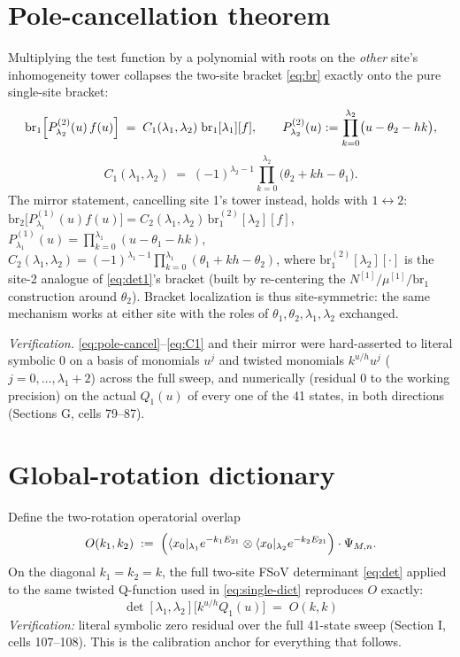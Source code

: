 \documentclass[11pt]{article}
\begin{document}
\section{Pole-cancellation theorem}
\label{sec:pole-cancel}

Multiplying the test function by a polynomial with roots on the \emph{other} site's inhomogeneity
tower collapses the two-site bracket \eqref{eq:br} exactly onto the pure single-site bracket:
\begin{equation}
  \mathrm{br}_1\Bigl[P^{(2)}_{\lambda_2}(u)\,f(u)\Bigr] \;=\; C_1(\lambda_1,\lambda_2)\;\mathrm{br}_1[\lambda_1][f],
  \qquad
  P^{(2)}_{\lambda_2}(u) := \prod_{k=0}^{\lambda_2}\bigl(u-\theta_2-hk\bigr),
  \label{eq:pole-cancel}
\end{equation}
\begin{equation}
  C_1(\lambda_1,\lambda_2) \;=\; (-1)^{\lambda_2-1}\prod_{k=0}^{\lambda_2}\bigl(\theta_2+kh-\theta_1\bigr).
  \label{eq:C1}
\end{equation}
The mirror statement, cancelling site 1's tower instead, holds with $1\leftrightarrow2$:
$\mathrm{br}_2\bigl[P^{(1)}_{\lambda_1}(u) f(u)\bigr] = C_2(\lambda_1,\lambda_2)\,\mathrm{br}_1^{(2)}[\lambda_2][f]$,
$P^{(1)}_{\lambda_1}(u)=\prod_{k=0}^{\lambda_1}(u-\theta_1-hk)$,
$C_2(\lambda_1,\lambda_2)=(-1)^{\lambda_1-1}\prod_{k=0}^{\lambda_1}(\theta_1+kh-\theta_2)$, where
$\mathrm{br}_1^{(2)}[\lambda_2][\cdot]$ is the site-2 analogue of \eqref{eq:det1}'s bracket (built by
re-centering the $N^{[1]}/\mu^{[1]}/\mathrm{br}_1$ construction around $\theta_2$). Bracket
localization is thus site-symmetric: the same mechanism works at either site with the roles of
$\theta_1,\theta_2,\lambda_1,\lambda_2$ exchanged.

\emph{Verification.} \eqref{eq:pole-cancel}--\eqref{eq:C1} and their mirror were hard-asserted to
literal symbolic $0$ on a basis of monomials $u^j$ and twisted monomials $k^{u/h}u^j$
($j=0,\dots,\lambda_1+2$) across the full sweep, and numerically (residual $0$ to the working
precision) on the actual $Q_1(u)$ of every one of the 41 states, in both directions (Sections G,
cells 79--87).

\section{Global-rotation dictionary}
\label{sec:global}

Define the two-rotation operatorial overlap
\begin{equation}
  O(k_1,k_2) \;:=\; \Bigl(\langle x_0|_{\lambda_1}e^{-k_1E_{21}}\otimes\langle x_0|_{\lambda_2}e^{-k_2E_{21}}\Bigr)\cdot\Psi_{M,n}.
  \label{eq:Odef}
\end{equation}
On the diagonal $k_1=k_2=k$, the full two-site FSoV determinant \eqref{eq:det} applied to the same
twisted Q-function used in \eqref{eq:single-dict} reproduces $O$ exactly:
\begin{equation}
  \boxed{\;\det[\lambda_1,\lambda_2]\bigl[k^{u/h}Q_1(u)\bigr] \;=\; O(k,k)\;}
  \label{eq:step0}
\end{equation}
\emph{Verification:} literal symbolic zero residual over the full 41-state sweep (Section I, cells
107--108). This is the calibration anchor for everything that follows.
\end{document}
